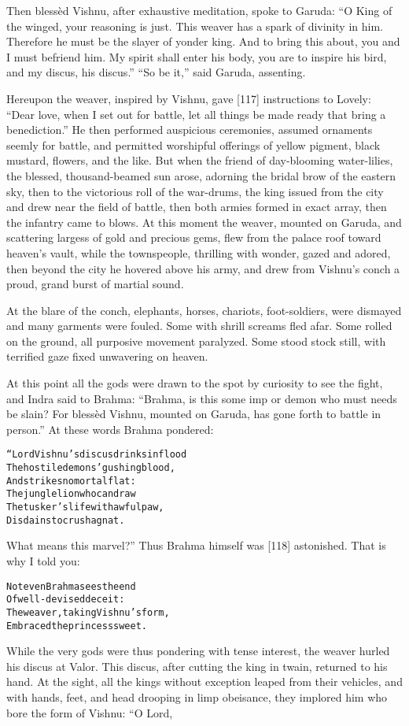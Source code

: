 \documentclass{article}
\renewenvironment{verbatim}{\begin{alltt}\normalfont\begin{centering}}{\end{centering}\end{alltt}}
\begin{document}
Then blessèd Vishnu, after exhaustive meditation, spoke to Garuda:
``O King of the winged, your reasoning is just. This weaver has a spark of divinity in him. Therefore he must be the slayer of yonder king. And to bring this about, you and I must befriend him. My spirit shall enter his body, you are to inspire his bird, and my discus, his discus.''
``So be it,'' said Garuda, assenting.

Hereupon the weaver, inspired by Vishnu, gave [117] instructions to
Lovely:
``Dear love, when I set out for battle, let all things be made ready that bring a benediction.''
He then performed auspicious ceremonies, assumed ornaments seemly
for battle, and permitted worshipful offerings of yellow pigment,
black mustard, flowers, and the like. But when the friend of
day-blooming water-lilies, the blessed, thousand-beamed sun arose,
adorning the bridal brow of the eastern sky, then to the victorious
roll of the war-drums, the king issued from the city and drew near
the field of battle, then both armies formed in exact array, then
the infantry came to blows. At this moment the weaver, mounted on
Garuda, and scattering largess of gold and precious gems, flew from
the palace roof toward heaven's vault, while the townspeople,
thrilling with wonder, gazed and adored, then beyond the city he
hovered above his army, and drew from Vishnu's conch a proud, grand
burst of martial sound.

At the blare of the conch, elephants, horses, chariots,
foot-soldiers, were dismayed and many garments were fouled. Some
with shrill screams fled afar. Some rolled on the ground, all
purposive movement paralyzed. Some stood stock still, with
terrified gaze fixed unwavering on heaven.

At this point all the gods were drawn to the spot by curiosity to
see the fight, and Indra said to Brahma:
``Brahma, is this some imp or demon who must needs be slain? For blessèd Vishnu, mounted on Garuda, has gone forth to battle in person.''
At these words Brahma pondered:

\begin{verbatim}
“Lord Vishnu's discus drinks in flood
The hostile demons' gushing blood,
    And strikes no mortal flat:
The jungle lion who can draw
The tusker's life with awful paw,
    Disdains to crush a gnat.
\end{verbatim}
What means this marvel?” Thus Brahma himself was [118] astonished.
That is why I told you:

\begin{verbatim}
Not even Brahma sees the end
    Of well-devised deceit:
The weaver, taking Vishnu's form,
    Embraced the princess sweet.
\end{verbatim}
While the very gods were thus pondering with tense interest, the
weaver hurled his discus at Valor. This discus, after cutting the
king in twain, returned to his hand. At the sight, all the kings
without exception leaped from their vehicles, and with hands, feet,
and head drooping in limp obeisance, they implored him who bore the
form of Vishnu: “O Lord,
\end{document}
